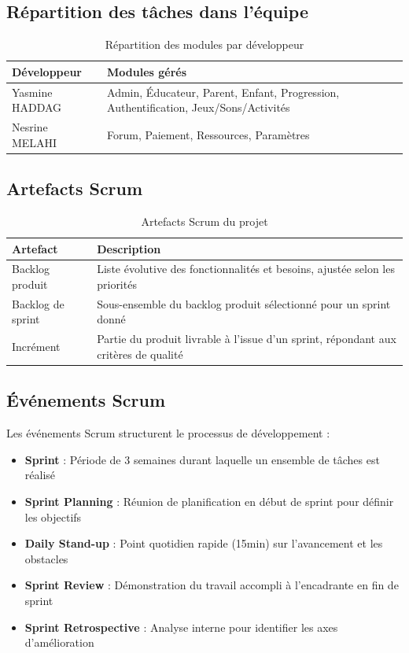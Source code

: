 \documentclass[12pt,a4paper]{report}
\begin{document}
\subsection{Répartition des tâches dans l'équipe}

\begin{table}[h]
\centering
\begin{tabular}{|p{4cm}|p{10cm}|}
\hline
\textbf{Développeur} & \textbf{Modules gérés} \\
\hline
Yasmine HADDAG & Admin, Éducateur, Parent, Enfant, Progression, Authentification, Jeux/Sons/Activités \\
\hline
Nesrine MELAHI & Forum, Paiement, Ressources, Paramètres \\
\hline
\end{tabular}
\caption{Répartition des modules par développeur}
\end{table}

\subsection{Artefacts Scrum}

\begin{table}[h]
\centering
\begin{tabular}{|p{4cm}|p{10cm}|}
\hline
\textbf{Artefact} & \textbf{Description} \\
\hline
Backlog produit & Liste évolutive des fonctionnalités et besoins, ajustée selon les priorités \\
\hline
Backlog de sprint & Sous-ensemble du backlog produit sélectionné pour un sprint donné \\
\hline
Incrément & Partie du produit livrable à l'issue d'un sprint, répondant aux critères de qualité \\
\hline
\end{tabular}
\caption{Artefacts Scrum du projet}
\end{table}

\subsection{Événements Scrum}

Les événements Scrum structurent le processus de développement :

\begin{itemize}
    \item \textbf{Sprint} : Période de 3 semaines durant laquelle un ensemble de tâches est réalisé
    \item \textbf{Sprint Planning} : Réunion de planification en début de sprint pour définir les objectifs
    \item \textbf{Daily Stand-up} : Point quotidien rapide (15min) sur l'avancement et les obstacles
    \item \textbf{Sprint Review} : Démonstration du travail accompli à l'encadrante en fin de sprint
    \item \textbf{Sprint Retrospective} : Analyse interne pour identifier les axes d'amélioration
\end{itemize}
\end{document}
